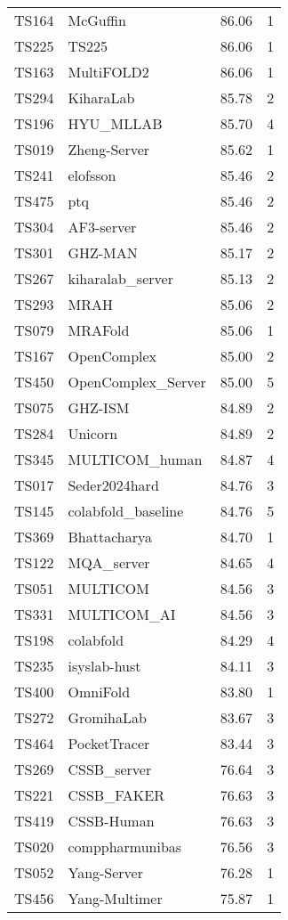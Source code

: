 \begin{table}[ht]
{\begin{tabular}{llrr}
TS164 & McGuffin & 86.06 & 1 \\ 
TS225 & TS225 & 86.06 & 1 \\ 
TS163 & MultiFOLD2 & 86.06 & 1 \\ 
TS294 & KiharaLab & 85.78 & 2 \\ 
TS196 & HYU\_MLLAB & 85.70 & 4 \\ 
TS019 & Zheng-Server & 85.62 & 1 \\ 
TS241 & elofsson & 85.46 & 2 \\ 
TS475 & ptq & 85.46 & 2 \\ 
TS304 & AF3-server & 85.46 & 2 \\ 
TS301 & GHZ-MAN & 85.17 & 2 \\ 
TS267 & kiharalab\_server & 85.13 & 2 \\ 
TS293 & MRAH & 85.06 & 2 \\ 
TS079 & MRAFold & 85.06 & 1 \\ 
TS167 & OpenComplex & 85.00 & 2 \\ 
TS450 & OpenComplex\_Server & 85.00 & 5 \\ 
TS075 & GHZ-ISM & 84.89 & 2 \\ 
TS284 & Unicorn & 84.89 & 2 \\ 
TS345 & MULTICOM\_human & 84.87 & 4 \\ 
TS017 & Seder2024hard & 84.76 & 3 \\ 
TS145 & colabfold\_baseline & 84.76 & 5 \\ 
TS369 & Bhattacharya & 84.70 & 1 \\ 
TS122 & MQA\_server & 84.65 & 4 \\ 
TS051 & MULTICOM & 84.56 & 3 \\ 
TS331 & MULTICOM\_AI & 84.56 & 3 \\ 
TS198 & colabfold & 84.29 & 4 \\ 
TS235 & isyslab-hust & 84.11 & 3 \\ 
TS400 & OmniFold & 83.80 & 1 \\ 
TS272 & GromihaLab & 83.67 & 3 \\ 
TS464 & PocketTracer & 83.44 & 3 \\ 
TS269 & CSSB\_server & 76.64 & 3 \\ 
TS221 & CSSB\_FAKER & 76.63 & 3 \\ 
TS419 & CSSB-Human & 76.63 & 3 \\ 
TS020 & comppharmunibas & 76.56 & 3 \\ 
TS052 & Yang-Server & 76.28 & 1 \\ 
TS456 & Yang-Multimer & 75.87 & 1 \\ 

\end{tabular}}
\end{table}
